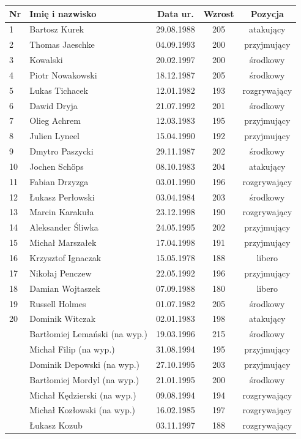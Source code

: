 \documentclass{article}
\begin{document}
\begin{tabular}{|l|l|c|c|c|} \hline
Nr	&Imię i nazwisko	&Data ur.	&Wzrost	&Pozycja \\ \hline 
1	&Bartosz Kurek	&29.08.1988	&205	&atakujący\\ \hline 
2	&Thomas Jaeschke	&04.09.1993	&200	&przyjmujący\\ \hline 
3	&Kowalski	&20.02.1997	&200	&środkowy\\ \hline 
4	&Piotr Nowakowski	&18.12.1987	&205	&środkowy\\ \hline 
5	&Lukas Tichacek	&12.01.1982	&193	&rozgrywający\\ \hline 
6	&Dawid Dryja	&21.07.1992	&201	&środkowy\\ \hline 
7	&Olieg Achrem	&12.03.1983	&195	&przyjmujący\\ \hline 
8	&Julien Lyneel	&15.04.1990	&192	&przyjmujący\\ \hline 
9	&Dmytro Paszycki	&29.11.1987	&202	&środkowy\\ \hline 
10	&Jochen Schöps	&08.10.1983	&204	&atakujący\\ \hline 
11	&Fabian Drzyzga	&03.01.1990	&196	&rozgrywający\\ \hline 
12	&Łukasz Perłowski	&03.04.1984	&203	&środkowy\\ \hline 
13	&Marcin Karakuła	&23.12.1998	&190	&rozgrywający\\ \hline 
14	&Aleksander Śliwka	&24.05.1995	&202	&przyjmujący\\ \hline 
15	&Michał Marszałek	&17.04.1998	&191	&przyjmujący\\ \hline 
16	&Krzysztof Ignaczak	&15.05.1978	&188	&libero\\ \hline 
17	&Nikołaj Penczew	&22.05.1992	&196	&przyjmujący\\ \hline 
18	&Damian Wojtaszek	&07.09.1988	&180	&libero\\ \hline 
19	& Russell Holmes	&01.07.1982	&205	&środkowy\\ \hline 
20	&Dominik Witczak	&02.01.1983	&198	&atakujący\\ \hline 
&Bartłomiej Lemański (na wyp.)	&19.03.1996	&215	&środkowy\\ \hline 
&Michał Filip (na wyp.)	&31.08.1994&	195&	przyjmujący\\ \hline 
&Dominik Depowski (na wyp.)	&27.10.1995	&203	&przyjmujący\\ \hline 
&Bartłomiej Mordyl (na wyp.)	&21.01.1995&	200	&środkowy\\ \hline 
&Michał Kędzierski (na wyp.)	&09.08.1994	&194	&rozgrywający\\ \hline 
&Michał Kozłowski (na wyp.)	&16.02.1985	&197	&rozgrywający\\ \hline 
&Łukasz Kozub	&03.11.1997	&188	&rozgrywający\\ 
\hline	
\end{tabular}	
\end{document}
